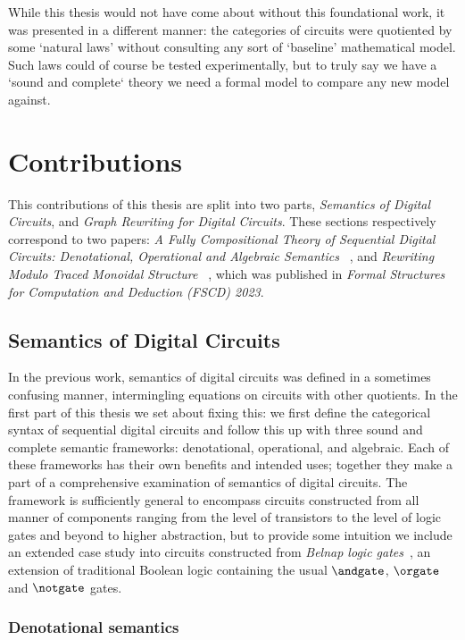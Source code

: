 While this thesis would not have come about without this foundational work, it
was presented in a different manner: the categories of circuits were quotiented
by some `natural laws' without consulting any sort of `baseline' mathematical
model.
Such laws could of course be tested experimentally, but to truly say we have a
`sound and complete` theory we need a formal model to compare any new model
against.

\section{Contributions}

This contributions of this thesis are split into two parts,
\emph{Semantics of Digital Circuits}, and
\emph{Graph Rewriting for Digital Circuits}.
These sections respectively correspond to two papers:
\emph{%
    A Fully Compositional Theory of Sequential Digital Circuits:
    Denotational, Operational and Algebraic Semantics%
}~\cite{ghica2024fully}, and \emph{%
    Rewriting Modulo Traced Monoidal Structure%
}~\cite{ghica2023rewriting}, which was published in
\emph{Formal Structures for Computation and Deduction (FSCD) 2023}.

\subsection{Semantics of Digital Circuits}

In the previous work, semantics of digital circuits was defined in a sometimes
confusing manner, intermingling equations on circuits with other quotients.
In the first part of this thesis we set about fixing this: we first define the
categorical syntax of sequential digital circuits and follow this up with three
sound and complete semantic frameworks: denotational, operational, and
algebraic.
Each of these frameworks has their own benefits and intended uses; together they
make a part of a comprehensive examination of semantics of digital circuits.
The framework is sufficiently general to encompass circuits constructed from
all manner of components ranging from the level of transistors to the level of
logic gates and beyond to higher abstraction, but to provide some intuition we
include an extended case study into circuits constructed from
\emph{Belnap logic gates}~\cite{belnap1977useful}, an extension of traditional
Boolean logic containing the usual \(\andgate\), \(\orgate\) and \(\notgate\)
gates.

\subsubsection{Denotational semantics}

